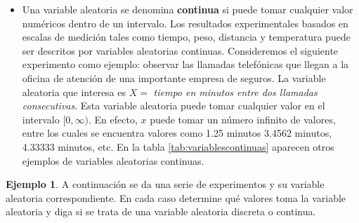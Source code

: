 \documentclass[
]{book}
\providecommand{\tightlist}{%
  \setlength{\itemsep}{0pt}\setlength{\parskip}{0pt}}
\theoremstyle{definition}
\theoremstyle{definition}
\newtheorem{example}{Ejemplo}[chapter]
\theoremstyle{definition}
\theoremstyle{definition}
\theoremstyle{remark}
\begin{document}
\begin{itemize}
\tightlist
\item
  Una variable aleatoria se denomina \textbf{continua} si puede tomar cualquier valor numéricos dentro de un intervalo. Los resultados experimentales basados en escalas de medición tales como tiempo, peso, distancia y temperatura puede ser descritos por variables aleatorias continuas. Consideremos el siguiente experimento como ejemplo: observar las llamadas telefónicas que llegan a la oficina de atención de una importante empresa de seguros. La variable aleatoria que interesa es \(X =\) \emph{tiempo en minutos entre dos llamadas consecutivas}. Esta variable aleatoria puede tomar cualquier valor en el intervalo \([0, \infty)\). En efecto, \(x\) puede tomar un número infinito de valores, entre los cuales se encuentra valores como 1.25 minutos 3.4562 minutos, 4.33333 minutos, etc. En la tabla \ref{tab:variablescontinuas} aparecen otros ejemplos de variables aleatorias continuas.
\end{itemize}

\begin{table}[H]

\caption{\label{tab:variablescontinuas}Ejemplos de variables aleatorias discretas}
\centering
{}
\end{table}

\begin{example}
A continuación se da una serie de experimentos y su variable aleatoria correspondiente. En cada caso determine qué valores toma la variable aleatoria y diga si se trata de una variable aleatoria discreta o continua.
\end{example}
\end{document}
